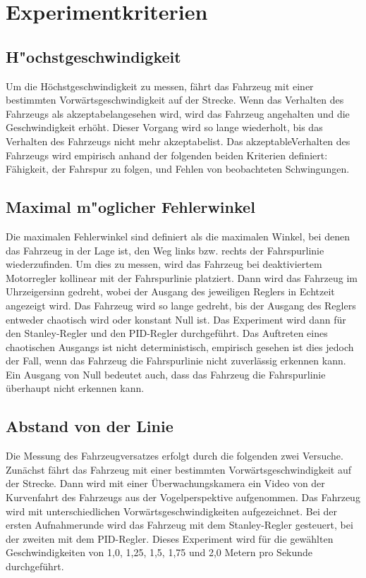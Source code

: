 \documentclass[arbeit=studie,oneside,BCOR=12mm]{ArbeitRST}
\begin{document}
\section{Experimentkriterien}

\subsection{H"ochstgeschwindigkeit}

Um die Höchstgeschwindigkeit zu messen, fährt das Fahrzeug mit einer bestimmten
Vorwärtsgeschwindigkeit auf der Strecke. Wenn das Verhalten des Fahrzeugs als
\glqq akzeptabel\grqq angesehen wird, wird das Fahrzeug angehalten und die
Geschwindigkeit erhöht. Dieser Vorgang wird so lange wiederholt, bis das
Verhalten des Fahrzeugs nicht mehr \glqq akzeptabel\grqq ist. Das \glqq
akzeptable\grqq Verhalten des Fahrzeugs wird empirisch anhand der folgenden
beiden Kriterien definiert: Fähigkeit, der Fahrspur zu folgen, und Fehlen von
beobachteten Schwingungen.

\subsection{Maximal m"oglicher Fehlerwinkel}

Die maximalen Fehlerwinkel sind definiert als die maximalen Winkel, bei denen
das Fahrzeug in der Lage ist, den Weg links bzw. rechts der Fahrspurlinie
wiederzufinden. Um dies zu messen, wird das Fahrzeug bei deaktiviertem
Motorregler kollinear mit der Fahrspurlinie platziert. Dann wird das Fahrzeug
im Uhrzeigersinn gedreht, wobei der Ausgang des jeweiligen Reglers in Echtzeit
angezeigt wird. Das Fahrzeug wird so lange gedreht, bis der Ausgang des Reglers
entweder chaotisch wird oder konstant Null ist. Das Experiment wird dann für
den Stanley-Regler und den PID-Regler durchgeführt. Das Auftreten eines
chaotischen Ausgangs ist nicht deterministisch, empirisch gesehen ist dies
jedoch der Fall, wenn das Fahrzeug die Fahrspurlinie nicht zuverlässig erkennen
kann. Ein Ausgang von Null bedeutet auch, dass das Fahrzeug die Fahrspurlinie
überhaupt nicht erkennen kann.

\subsection{Abstand von der Linie}

Die Messung des Fahrzeugversatzes erfolgt durch die folgenden zwei Versuche.
Zunächst fährt das Fahrzeug mit einer bestimmten Vorwärtsgeschwindigkeit auf
der Strecke. Dann wird mit einer Überwachungskamera ein Video von der
Kurvenfahrt des Fahrzeugs aus der Vogelperspektive aufgenommen. Das Fahrzeug
wird mit unterschiedlichen Vorwärtsgeschwindigkeiten aufgezeichnet. Bei der
ersten Aufnahmerunde wird das Fahrzeug mit dem Stanley-Regler gesteuert, bei
der zweiten mit dem PID-Regler. Dieses Experiment wird für die gewählten
Geschwindigkeiten von 1,0, 1,25, 1,5, 1,75 und 2,0 Metern pro Sekunde
durchgeführt.
\end{document}
